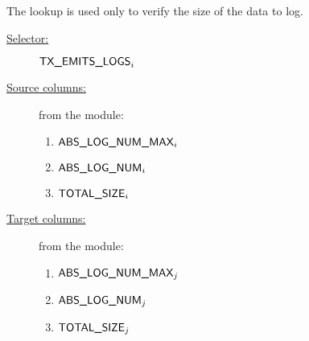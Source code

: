 The lookup is used only to verify the size of the data to log.
\begin{description}
	\item[\underline{Selector:}] $\textsf{TX\_EMITS\_LOGS}_{i}$
	\item[\underline{Source columns:}] from the \logInfoMod{} module:
	\begin{multicols}{3}
	\begin{enumerate}
			\item $\textsf{ABS\_LOG\_NUM\_MAX}{}_{i}$
			\item $\textsf{ABS\_LOG\_NUM}{}_{i}$
			\item $\textsf{TOTAL\_SIZE}{}_{i}$
	\end{enumerate}
	\end{multicols}
\item[\underline{Target columns:}] from the \logDataMod{} module: 
	\begin{multicols}{3}
	\begin{enumerate}
			\item $\textsf{ABS\_LOG\_NUM\_MAX}{}_{j}$
			\item $\textsf{ABS\_LOG\_NUM}{}_{j}$
			\item $\textsf{TOTAL\_SIZE}{}_{j}$
	\end{enumerate} 
	\end{multicols}
\end{description}